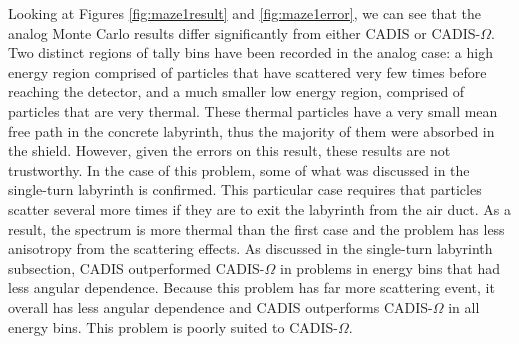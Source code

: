 Looking at Figures \ref{fig:maze1result} and \ref{fig:maze1error}, we can see
that the analog Monte Carlo results differ significantly from either CADIS or
CADIS-$\Omega$. Two distinct regions of tally bins have been recorded in the
analog case: a high energy region comprised of particles that have scattered
very few times before reaching the detector, and a much smaller low energy
region, comprised of particles that are very thermal. These thermal particles
have a very small mean free path in the concrete labyrinth, thus the majority of them were
absorbed in the shield. However, given the errors on this result, these results are
not trustworthy. In the case of this problem, some of what was discussed in the
single-turn labyrinth is confirmed. This particular case requires that particles
scatter several more times if they are to exit the labyrinth from the air duct.
As a result, the spectrum is more thermal than the first case and the problem
has less anisotropy from the scattering effects.
As discussed in the single-turn labyrinth subsection, CADIS
outperformed CADIS-$\Omega$ in problems in energy bins that had less angular
dependence. Because this problem has far more scattering event, it overall has
less angular dependence and CADIS outperforms CADIS-$\Omega$ in all energy bins.
This problem is poorly suited to CADIS-$\Omega$.

